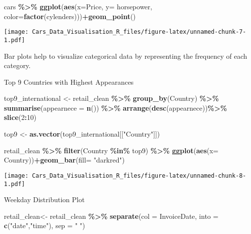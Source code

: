 \documentclass[
]{article}
\newenvironment{Shaded}{\begin{snugshade}}{\end{snugshade}}
\newcommand{\AttributeTok}[1]{\textcolor[rgb]{0.13,0.29,0.53}{#1}}
\newcommand{\DecValTok}[1]{\textcolor[rgb]{0.00,0.00,0.81}{#1}}
\newcommand{\FunctionTok}[1]{\textcolor[rgb]{0.13,0.29,0.53}{\textbf{#1}}}
\newcommand{\NormalTok}[1]{#1}
\newcommand{\OtherTok}[1]{\textcolor[rgb]{0.56,0.35,0.01}{#1}}
\newcommand{\SpecialCharTok}[1]{\textcolor[rgb]{0.81,0.36,0.00}{\textbf{#1}}}
\newcommand{\StringTok}[1]{\textcolor[rgb]{0.31,0.60,0.02}{#1}}
\begin{document}
\begin{Shaded}
\begin{Highlighting}[]
\NormalTok{cars }\SpecialCharTok{\%\textgreater{}\%} \FunctionTok{ggplot}\NormalTok{(}\FunctionTok{aes}\NormalTok{(}\AttributeTok{x=}\NormalTok{Price, }\AttributeTok{y=}\NormalTok{ horsepower, }\AttributeTok{color=}\FunctionTok{factor}\NormalTok{(cylenders)))}\SpecialCharTok{+}\FunctionTok{geom\_point}\NormalTok{()}
\end{Highlighting}
\end{Shaded}

\texttt{[image: Cars\_Data\_Visualisation\_R\_files/figure-latex/unnamed-chunk-7-1.pdf]}

Bar plots help to visualize categorical data by representing the
frequency of each category.

Top 9 Countries with Highest Appearances

\begin{Shaded}
\begin{Highlighting}[]
\NormalTok{top9\_international }\OtherTok{\textless{}{-}}\NormalTok{ retail\_clean }\SpecialCharTok{\%\textgreater{}\%} \FunctionTok{group\_by}\NormalTok{(Country) }\SpecialCharTok{\%\textgreater{}\%} \FunctionTok{summarise}\NormalTok{(}\AttributeTok{appearnece =} \FunctionTok{n}\NormalTok{()) }\SpecialCharTok{\%\textgreater{}\%} \FunctionTok{arrange}\NormalTok{(}\FunctionTok{desc}\NormalTok{(appearnece))}\SpecialCharTok{\%\textgreater{}\%} 
  \FunctionTok{slice}\NormalTok{(}\DecValTok{2}\SpecialCharTok{:}\DecValTok{10}\NormalTok{) }

\NormalTok{top9 }\OtherTok{\textless{}{-}} \FunctionTok{as.vector}\NormalTok{(top9\_international[[}\StringTok{"Country"}\NormalTok{]])}

\NormalTok{retail\_clean }\SpecialCharTok{\%\textgreater{}\%} \FunctionTok{filter}\NormalTok{(Country }\SpecialCharTok{\%in\%}\NormalTok{ top9) }\SpecialCharTok{\%\textgreater{}\%} \FunctionTok{ggplot}\NormalTok{(}\FunctionTok{aes}\NormalTok{(}\AttributeTok{x=}\NormalTok{ Country))}\SpecialCharTok{+}\FunctionTok{geom\_bar}\NormalTok{(}\AttributeTok{fill=} \StringTok{"darkred"}\NormalTok{)}
\end{Highlighting}
\end{Shaded}

\texttt{[image: Cars\_Data\_Visualisation\_R\_files/figure-latex/unnamed-chunk-8-1.pdf]}

Weekday Distribution Plot

\begin{Shaded}
\begin{Highlighting}[]
\NormalTok{retail\_clean}\OtherTok{\textless{}{-}}\NormalTok{ retail\_clean }\SpecialCharTok{\%\textgreater{}\%} \FunctionTok{separate}\NormalTok{(}\AttributeTok{col =}\NormalTok{ InvoiceDate,}
                                         \AttributeTok{into =} \FunctionTok{c}\NormalTok{(}\StringTok{"date"}\NormalTok{,}\StringTok{"time"}\NormalTok{),}
                                         \AttributeTok{sep =} \StringTok{" "}\NormalTok{)}
\end{Highlighting}
\end{Shaded}
\end{document}
